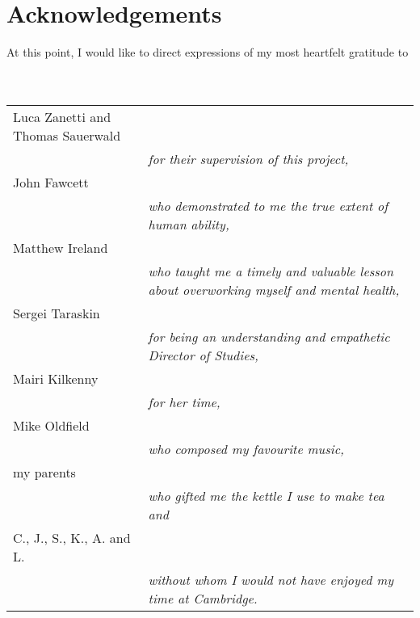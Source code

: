 \thispagestyle{fancychapter}
\section*{Acknowledgements}

At this point, I would like to direct expressions of my most heartfelt gratitude to
\\\ \\\ \\
\begin{tabular}{R{0.45\textwidth}L{0.5\textwidth}}
Luca Zanetti and Thomas Sauerwald	\\&\itshape	for their supervision of this project,\\
John Fawcett				\\&\itshape	who demonstrated to me the true extent of human ability,\\
Matthew Ireland				\\&\itshape 	who taught me a timely and valuable lesson about overworking myself and mental health,\\
Sergei Taraskin			\\&\itshape	for being an understanding and empathetic Director of Studies,\\
Mairi Kilkenny				\\&\itshape	for her time,\\
Mike Oldfield				\\&\itshape	who composed my favourite music,\\
my parents				\\&\itshape	who gifted me the kettle I use to make tea and\\
C., J., S., K., A. and L.		\\&\itshape	without whom I would not have enjoyed my time at Cambridge.
\end{tabular}
